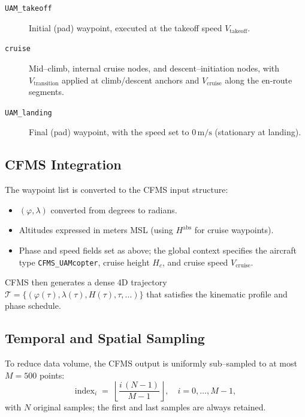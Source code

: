 \begin{description}
  \item[\texttt{UAM\_takeoff}] Initial (pad) waypoint, executed at the takeoff speed \(V_{\text{takeoff}}\).
  \item[\texttt{cruise}] Mid–climb, internal cruise nodes, and descent–initiation nodes,
  with \(V_{\text{transition}}\) applied at climb/descent anchors and \(V_{\text{cruise}}\) along the en-route segments.
  \item[\texttt{UAM\_landing}] Final (pad) waypoint, with the speed set to \(0\,\text{m/s}\) (stationary at landing).
\end{description}


\subsection{CFMS Integration}
The waypoint list is converted to the CFMS input structure:
\begin{itemize}
  \item $(\varphi,\lambda)$ converted from degrees to radians.
  \item Altitudes expressed in meters MSL (using $H^{\text{abs}}$ for cruise waypoints).
  \item Phase and speed fields set as above; the global context specifies the aircraft type
  \texttt{CFMS\_UAMcopter}, cruise height $H_c$, and cruise speed $V_{\text{cruise}}$.
\end{itemize}
CFMS \cite{morscheck2021cfms} then generates a dense 4D trajectory
\(\mathcal{T} = \{(\varphi(\tau), \lambda(\tau), H(\tau), \tau, \dots)\}\) that satisfies the kinematic
profile and phase schedule.

\subsection{Temporal and Spatial Sampling}
To reduce data volume, the CFMS output is uniformly sub–sampled to at most $M=500$ points:
\begin{equation}
  \mathrm{index}_i \;=\; \left\lfloor \frac{i\,(N-1)}{M-1} \right\rfloor,\quad i=0,\dots,M-1,
\end{equation}
with $N$ original samples; the first and last samples are always retained.

